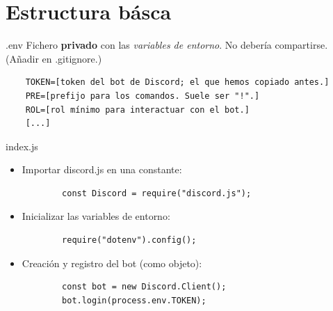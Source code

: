 \documentclass[10pt]{beamer} %
\begin{document}
\section{Estructura básca}
\begin{frame}[fragile]{.env}
    Fichero \textbf{privado} con las \textit{variables de entorno}. No debería compartirse. (Añadir en .gitignore.)
    \begin{verbatim}
    TOKEN=[token del bot de Discord; el que hemos copiado antes.]
    PRE=[prefijo para los comandos. Suele ser "!".]
    ROL=[rol mínimo para interactuar con el bot.]
    [...]
    \end{verbatim}
\end{frame}
\begin{frame}[fragile]{index.js}
    \begin{itemize}
        \item Importar discord.js en una constante:
        \begin{verbatim}
        const Discord = require("discord.js");
        \end{verbatim}
        \item Inicializar las variables de entorno:
        \begin{verbatim}
        require("dotenv").config();
        \end{verbatim}
        \item Creación y registro del bot (como objeto):
        \begin{verbatim}
        const bot = new Discord.Client();
        bot.login(process.env.TOKEN);
        \end{verbatim}
    \end{itemize}
\end{frame}
\end{document}
